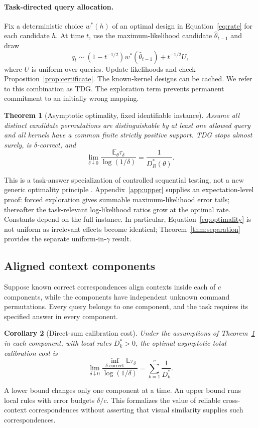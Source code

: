 \documentclass{article}
\newtheorem{theorem}{Theorem}
\newtheorem{corollary}[theorem]{Corollary}
\newcommand{\E}{\mathbb E}
\begin{document}
\paragraph{Task-directed query allocation.}
Fix a deterministic choice $w^*(h)$ of an optimal design in Equation~\eqref{eq:rate} for each candidate $h$. At time $t$, use the maximum-likelihood candidate $\hat\theta_{t-1}$ and draw
\begin{equation}
q_t\sim (1-t^{-1/2})w^*(\hat\theta_{t-1})+t^{-1/2}U, \label{eq:algorithm}
\end{equation}
where $U$ is uniform over queries. Update likelihoods and check Proposition~\ref{prop:certificate}. The known-kernel designs can be cached. We refer to this combination as TDG. The exploration term prevents permanent commitment to an initially wrong mapping.
\begin{theorem}[Asymptotic optimality, fixed identifiable instance]\label{thm:upper}
Assume all distinct candidate permutations are distinguishable by at least one allowed query and all kernels have a common finite strictly positive support. TDG stops almost surely, is $\delta$-correct, and
\begin{equation}
\lim_{\delta\downarrow0}\frac{\E_\theta\tau_\delta}{\log(1/\delta)}=\frac{1}{D_R^*(\theta)}. \label{eq:optimality}
\end{equation}
\end{theorem}
This is a task-answer specialization of controlled sequential testing, not a new generic optimality principle \citep{nitinawarat2012}. Appendix~\ref{app:upper} supplies an expectation-level proof: forced exploration gives summable maximum-likelihood error tails; thereafter the task-relevant log-likelihood ratios grow at the optimal rate. Constants depend on the full instance. In particular, Equation~\eqref{eq:optimality} is not uniform as irrelevant effects become identical; Theorem~\ref{thm:separation} provides the separate uniform-in-$\gamma$ result.

\subsection{Aligned context components}
Suppose known correct correspondences align contexts inside each of $c$ components, while the components have independent unknown command permutations. Every query belongs to one component, and the task requires its specified answer in every component.
\begin{corollary}[Direct-sum calibration cost]\label{cor:components}
Under the assumptions of Theorem~\ref{thm:upper} in each component, with local rates $D_k^*>0$, the optimal asymptotic total calibration cost is
\begin{equation}
\lim_{\delta\downarrow0}\frac{\inf_{\delta\text{-correct}}\E\tau_\delta}{\log(1/\delta)}
=\sum_{k=1}^c\frac1{D_k^*}. \label{eq:components}
\end{equation}
\end{corollary}
A lower bound changes only one component at a time. An upper bound runs local rules with error budgets $\delta/c$. This formalizes the value of reliable cross-context correspondences without asserting that visual similarity supplies such correspondences.
\end{document}
